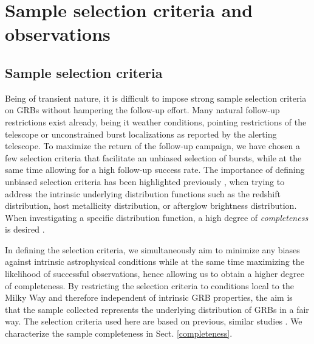 \documentclass{aa}    %
\begin{document}
\section{Sample selection criteria and observations}\label{sample}



\subsection{Sample selection criteria} \label{samplecrit}

Being of transient nature, it is difficult to impose strong sample selection
criteria on GRBs without hampering the follow-up effort. Many natural follow-up
restrictions exist already, being it weather conditions, pointing restrictions
of the telescope or unconstrained burst localizations as reported by the alerting
telescope. To maximize the return of the follow-up campaign, we have chosen a
few selection criteria that facilitate an unbiased selection of bursts, while
at the same time allowing for a high follow-up success rate. The importance of
defining unbiased selection criteria has been highlighted previously
\citep{Jakobsson2006b, Salvaterra2012, Hjorth2012, Vergani2015, Perley2016a},
when trying to address the intrinsic underlying distribution functions such as
the redshift distribution, host metallicity distribution, or afterglow
brightness distribution. When investigating a specific distribution function, a
high degree of \textit{completeness} is desired \citep[e.g.,][]{Perley2016b}.

In defining the selection criteria, we simultaneously aim to minimize any biases
against intrinsic astrophysical conditions while at the same time maximizing the
likelihood of successful observations, hence allowing us to obtain a higher
degree of completeness. By restricting the selection criteria to conditions
local to the Milky Way and therefore independent of intrinsic GRB properties,
the aim is that the sample collected represents the underlying distribution of
GRBs in a fair way. The selection criteria used here are based on previous,
similar studies \citep{Jakobsson2006b, Fynbo2009, Hjorth2012}. We characterize
the sample completeness in Sect. \ref{completeness}.
\end{document}
